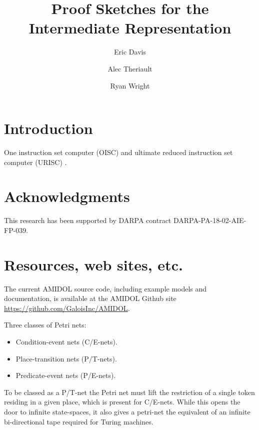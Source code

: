\documentclass[11pt]{article}
\date{\vspace{-5ex}}
\author{Eric Davis}
\author{Alec Theriault}
\author{Ryan Wright}
\affil{Galois, Inc}
\title{Proof Sketches for the \amidol{} Intermediate Representation}
\newcommand{\amidol}{\textsc{AMIDOL}}
\begin{document}
\maketitle
\vspace{10pt}
\begin{abstract}
\end{abstract}

\section{Introduction}

One instruction set computer (OISC) and ultimate reduced instruction set computer (URISC) \cite{mavaddat1988urisc}.

\section{Acknowledgments}

This research has been supported by DARPA contract DARPA-PA-18-02-AIE-FP-039.

\section{Resources, web sites, etc.}

The current \amidol{} source code, including example models and documentation, is available at the \amidol{} Github site \url{https://github.com/GaloisInc/AMIDOL}.

Three classes of Petri nets:
\begin{itemize}
\item Condition-event nets (C/E-nets).
\item Place-transition nets (P/T-nets).
\item Predicate-event nets (P/E-nets).
\end{itemize}
\cite{reisig2012petri}

To be classed as a P/T-net the Petri net must lift the restriction of a single token residing in a given place, which is present for C/E-nets.  While this opens the door to infinite state-spaces, it also gives a petri-net the equivalent of an infinite bi-directional tape required for Turing machines.  

\cite{ciardo1994petri}



\end{document}
